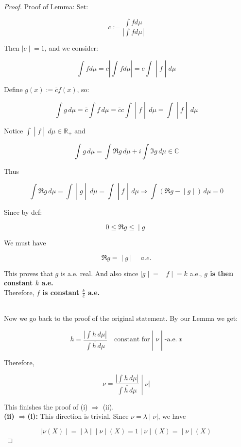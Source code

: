 \documentclass{qlnotes-export}
\begin{document}
\begin{proof}
Proof of Lemma: Set:

\[c := \frac{\int fd\mu}{\left| {\int fd\mu} \right|}\]

Then \(\left. |c \middle| = 1 \right.\), and we consider:

\[\left. \int fd\mu = c\left| {\int fd\mu} \right| = c\int \middle| f \middle| d\mu \right.\]

Define \(g(x) := \bar{c}f(x)\), so:

\[\left. \int g\, d\mu = \bar{c}\int f\, d\mu = \bar{c}c\int \middle| f \middle| \, d\mu = \int \middle| f \middle| \, d\mu \right.\]

Notice \(\left. \int \middle| f \middle| \, d\mu \in {\mathbb{R}}_{+} \right.\) and

\[\int g\, d\mu = \int\Re g\, d\mu + i\int\Im g\, d\mu \in {\mathbb{C}}\]

Thus

\[\left. \int\Re g\, d\mu = \int \middle| g \middle| \, d\mu = \int \middle| f \middle| \, d\mu\Longrightarrow\int(\Re g - \middle| g \middle| )\, d\mu = 0 \right.\]

Since by def:

\[\left. 0 \leq \Re g \leq \middle| g| \right.\]

We must have

\[\left. \Re g = \middle| g \middle| \quad a.e. \right.\]

This proves that \(g\) is a.e. real. And also since \(\left. |g \middle| = \middle| f \middle| = k \right.\) a.e., \textbf{\(g\) is then constant \(k\) a.e.}\\
Therefore, \textbf{\(f\) is constant \(\frac{k}{\bar{c}}\) a.e.}\\
\strut \\
Now we go back to the proof of the original statement. By our Lemma we get:

\[\left. h = \frac{\left| {\int h\, d\mu} \right|}{\bar{\int h\, d\mu}}\quad\text{constant for} \middle| \nu \middle| \text{-a.e.}\ x \right.\]

Therefore,

\[\left. \nu = \frac{\left| {\int h\, d\mu} \right|}{\bar{\int h\, d\mu}} \middle| \nu| \right.\]

This finishes the proof of (i) \(\Longrightarrow\) (ii).\\
\textbf{(ii) \(\Longrightarrow\)(i):} This direction is trivial. Since \(\left. \nu = \lambda \middle| \nu| \right.\), we have

\[\left. |\nu(X) \middle| = \middle| \lambda \middle| \middle| \nu \middle| (X) = 1 \middle| \nu \middle| (X) = \middle| \nu \middle| (X) \right.\]

\end{proof}
\end{document}
